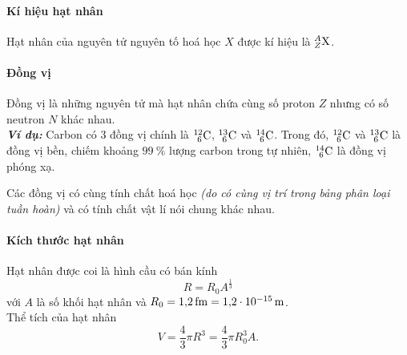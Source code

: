 \begin{tomtat}
	\paragraph{Kí hiệu hạt nhân}
	Hạt nhân của nguyên tử nguyên tố hoá học $X$ được kí hiệu là $^A_Z\ce{X}$.
	\paragraph{Đồng vị}
\begin{dn}
		Đồng vị là những nguyên tử mà hạt nhân chứa cùng số proton $Z$ nhưng có số neutron $N$ khác nhau.\\
	\textbf{\textit{Ví dụ:}} Carbon có 3 đồng vị chính là $^{12}_{\ 6}\ce{C}$, $^{13}_{\ 6}\ce{C}$ và  $^{14}_{\ 6}\ce{C}$. Trong đó, $^{12}_{\ 6}\ce{C}$ và $^{13}_{\ 6}\ce{C}$ là đồng vị bền, chiếm khoảng $\SI{99}{\percent}$ lượng carbon trong tự nhiên, $^{14}_{\ 6}\ce{C}$ là đồng vị phóng xạ.
\end{dn}
	\begin{luuy}
		Các đồng vị có cùng tính chất hoá học \textit{(do có cùng vị trí trong bảng phân loại tuần hoàn)} và có tính chất vật lí nói chung khác nhau.
	\end{luuy}
	\paragraph{Kích thước hạt nhân}
	\begin{boxdl}
		Hạt nhân được coi là hình cầu có bán kính
		\begin{equation}
			R=R_0A^{\frac{1}{3}}
		\end{equation}
		với $A$ là số khối hạt nhân và $R_0=\SI{1.2}{\femto\meter}=\SI{1.2E-15}{\meter}$.\\
		Thể tích của hạt nhân
		\begin{equation}
			V=\dfrac{4}{3}\pi R^3=\dfrac{4}{3}\pi R^3_0A.
		\end{equation}
	\end{boxdl}
\end{tomtat}
